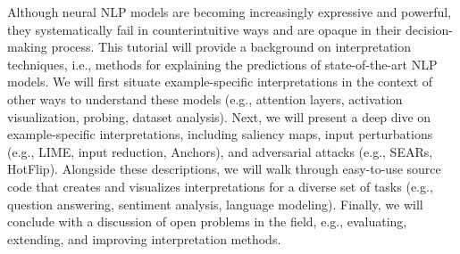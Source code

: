 Although neural NLP models are becoming increasingly expressive and powerful, they systematically fail in counterintuitive ways and are opaque in their decision-making process. This tutorial will provide a background on interpretation techniques, i.e., methods for explaining the predictions of state-of-the-art NLP models. We will first situate example-specific interpretations in the context of other ways to understand these models (e.g., attention layers, activation visualization, probing, dataset analysis). Next, we will present a deep dive on example-specific interpretations, including saliency maps, input perturbations (e.g., LIME, input reduction, Anchors), and adversarial attacks (e.g., SEARs, HotFlip). Alongside these descriptions, we will walk through easy-to-use source code that creates and visualizes interpretations for a diverse set of tasks (e.g., question answering, sentiment analysis, language modeling). Finally, we will conclude with a discussion of open problems in the field, e.g., evaluating, extending, and improving interpretation methods.

